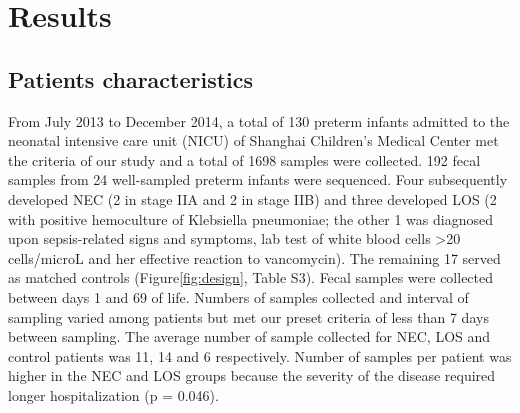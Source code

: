\documentclass[fleqn,10pt, lineno]{wlpeerj} %
\begin{document}
\section*{Results}
  \subsection*{Patients characteristics}
   From July 2013 to December 2014, a total of 130 preterm infants admitted to the neonatal intensive care unit (NICU) of Shanghai Children’s Medical Center met the criteria of our study and a total of 1698 samples were collected. 192 fecal samples from 24 well-sampled preterm infants were sequenced. Four subsequently developed NEC (2 in stage IIA and 2 in stage IIB) and three developed LOS (2 with positive hemoculture of Klebsiella pneumoniae; the other 1 was diagnosed upon sepsis-related signs and symptoms, lab test of white blood cells \textgreater 20 cells/microL and her effective reaction to vancomycin).  The remaining 17 served as matched controls (Figure\ref{fig:design}, Table S3). Fecal samples were collected between days 1 and 69 of life. Numbers of samples collected and interval of sampling varied among patients but met our preset criteria of less than 7 days between sampling. The average number of sample collected for NEC, LOS and control patients was 11, 14 and 6 respectively. Number of samples per patient was higher in the NEC and LOS groups because the severity of the disease required longer hospitalization (p = 0.046).

\end{document}
